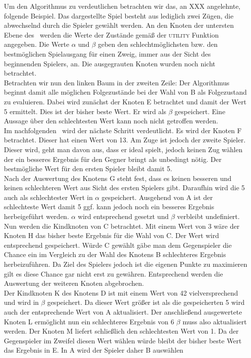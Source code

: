 Um den Algorithmus zu verdeutlichen betrachten wir das, an  XXX angelehnte, folgende Beispiel. Das dargestellte Spiel besteht aus lediglich zwei Zügen, die abwechselnd durch die Spieler gewählt werden. An den Knoten der untersten Ebene des \gtree\ werden die Werte der Zustände gemäß der \textsc{utility} Funktion angegeben. Die Werte $\alpha$ und $\beta$ geben den schlechtmöglichsten bzw. den bestmöglichen Spielausgang für einen Zweig, immer aus der Sicht des beginnenden Spielers, an. Die ausgegrauten Knoten wurden noch nicht betrachtet.\\
Betrachten wir nun den linken Baum in der zweiten Zeile: Der Algorithmus beginnt damit alle möglichen Folgezustände bei der Wahl von B als Folgezustand zu evaluieren. Dabei wird zunächst der Knoten E betrachtet und damit der Wert 5 ermittelt. Dies ist der bisher beste Wert. Er wird als $\beta$ gespeichert. Eine Aussage über den schlechtesten Wert kann noch nicht getroffen werden.\\
Im nachfolgenden \gtree\ wird der nächste Schritt verdeutlicht. Es wird der Knoten F betrachtet. Dieser hat einen Wert von 13. Am Zuge ist jedoch der zweite Spieler. Dieser wird, geht man davon aus, dass er ideal spielt, jedoch keinen Zug wählen der ein besseres Ergebnis für den Gegner bringt als unbedingt nötig. Der bestmögliche Wert für den ersten Spieler bleibt damit 5.\\
Nach der Auswertung des Knotens G steht fest, dass es keinen besseren und keinen schlechteren Wert aus Sicht des ersten Spielers gibt. Daraufhin wird die 5 auch als schlechtester Wert in $\alpha$ gespeichert. Ausgehend von A  ist der schlechteste Wert damit 5 ggf. kann jedoch noch ein besseres Ergebnis herbeigeführt werden. $\alpha$ wird entsprechend gesetzt und $\beta$ verbleibt undefiniert.\\
Nun werden die Kindknoten von C betrachtet. Mit einem Wert von 3 wäre der Knoten H das bisher beste Ergebnis für die Wahl von C. Der Wert wird entsprechend gespeichert. Würde C gewählt gäbe man dem Gegenspieler die Chance ein im Vergleich zu der Wahl des Knotens B schlechteres Ergebnis herbeizuführen. Da Ziel des Spielers jedoch ist die eigenen Punkte zu maximieren gilt es diese Chance gar nicht erst zu gewähren. Entsprechend werden die Auswertung der weiteren Knoten abgebrochen.\\
Der Kindknoten K des Knotens D ist mit einem Wert von 42 vielversprechend und wird in $\beta$ gespeichert. Da dieser Wert größer ist als die gespeicherten 5 wird auch der entsprechende Wert von A aktualisiert. Der anschließend ausgewertete Knoten L ermöglicht nun ein schlechteres Ergebnis von 6 $\beta$ muss also aktualisiert werden. Der Knoten M liefert schließlich den schlechtesten Wert von 1. Da der Gegenspieler im Zweifel diesen Wert wählen würde bleibt der bisher beste Wert das Ergebnis in E. In A wird der Spieler daher B auswählen
